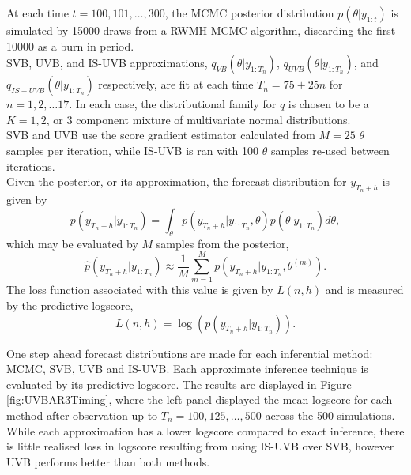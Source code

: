 \documentclass[12pt,a4paper]{article}\usepackage[]{graphicx}\usepackage[]{color}
\begin{document}
At each time $t = 100, 101, \ldots, 300$, the MCMC posterior distribution $p(\theta | y_{1:t})$ is simulated by 15000 draws from a RWMH-MCMC algorithm, discarding the first 10000 as a burn in period.
\\

SVB, UVB, and IS-UVB approximations, $q_{VB}(\theta | y_{1:T_n})$, $q_{UVB}(\theta | y_{1:T_n})$, and $q_{IS-UVB}(\theta | y_{1:T_n})$ respectively, are fit at each time $T_n = 75 + 25n$ for $n = 1, 2, \ldots 17$. In each case, the distributional family for $q$ is chosen to be a $K = 1, 2$, or $3$ component mixture of multivariate normal distributions.
\\

SVB and UVB use the score gradient estimator calculated from $M = 25$ $\theta$ samples per iteration, while IS-UVB is ran with 100 $\theta$ samples re-used between iterations.
\\

Given the posterior, or its approximation, the forecast distribution for $y_{T_n+h}$ is given by
\begin{equation}
\label{UVB:TSforecastDist}
p(y_{T_n + h} | y_{1:T_n}) = \int_{\theta} p(y_{T_n + h} | y_{1:T_n}, \theta)p(\theta | y_{1:T_n})d\theta,
\end{equation}
which may be evaluated by $M$ samples from the posterior,
\begin{equation}
\label{UVB:TSforecastDistApprox}
\hat{p}(y_{T_n + h} | y_{1:T_n}) \approx \frac{1}{M} \sum_{m=1}^M  p(y_{T_n + h} | y_{1:T_n}, \theta^{(m)}).
\end{equation}
The loss function associated with this value is given by $L(n, h)$ and is measured by the predictive logscore,
\begin{equation}
\label{UVB:TSlogscore}
L(n, h) = \log(p(y_{T_n + h} | y_{1:T_n})).
\end{equation}

One step ahead forecast distributions are made for each inferential method: MCMC, SVB, UVB and IS-UVB. Each approximate inference technique is evaluated by its predictive logscore. The results are displayed in Figure \ref{fig:UVBAR3Timing}, where the left panel displayed the mean logscore for each method after observation up to $T_n = 100, 125, \ldots, 500$ across the 500 simulations. While each approximation has a lower logscore compared to exact inference, there is little realised loss in logscore resulting from using IS-UVB over SVB, however UVB performs better than both methods.
\\
\end{document}
